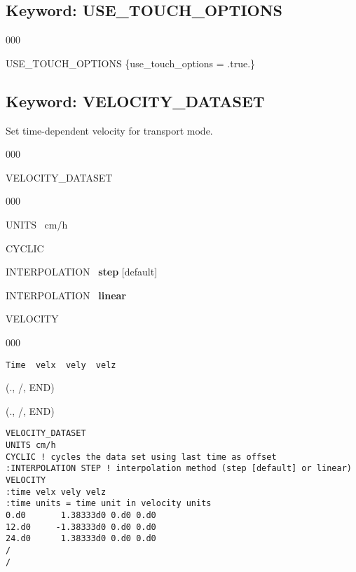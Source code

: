 \documentclass[12pt]{article}
\begin{document}
\subsection{Keyword: USE\_TOUCH\_OPTIONS}


\begin{deflist}{000}
\item[USE\_TOUCH\_OPTIONS] \{use\_touch\_options = .true.\}
\end{deflist}




\newpage
\protect\hypertarget{target_veldata}{}

\subsection{Keyword: VELOCITY\_DATASET}

 Set time-dependent velocity for transport mode.

\begin{deflist}{000}
\item[VELOCITY\_DATASET] ~
\begin{deflist}{000}
\item[UNITS] \ cm/h
\item[CYCLIC]
\item[INTERPOLATION] \ {\bf step} [default]
\item[INTERPOLATION] \ {\bf linear}
\item[VELOCITY] ~
\begin{deflist}{000}
\item[{\tt Time \ velx \ vely \ velz}]
\end{deflist}
\item[(., /, END)]
\end{deflist}
\item[(., /, END)]
\end{deflist}


\begin{verbatim}
VELOCITY_DATASET
UNITS cm/h
CYCLIC ! cycles the data set using last time as offset
:INTERPOLATION STEP ! interpolation method (step [default] or linear)
VELOCITY
:time velx vely velz
:time units = time unit in velocity units
0.d0       1.38333d0 0.d0 0.d0 
12.d0     -1.38333d0 0.d0 0.d0 
24.d0      1.38333d0 0.d0 0.d0 
/
/
\end{verbatim}
\end{document}
